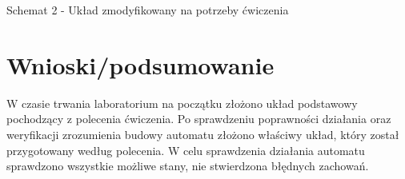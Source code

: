 \documentclass[12pt,a4paper]{article}
\begin{document}
		\vspace{0.5cm}
		\begin{center}
			Schemat 2 - Układ zmodyfikowany na potrzeby ćwiczenia
		\end{center}

	\section{Wnioski/podsumowanie}
	
		W czasie trwania laboratorium na początku złożono układ podstawowy pochodzący z polecenia ćwiczenia.
		Po sprawdzeniu poprawności działania oraz weryfikacji zrozumienia budowy automatu złożono właściwy
		układ, który został przygotowany według polecenia. W celu sprawdzenia działania automatu sprawdzono wszystkie możliwe stany,
		nie stwierdzona błędnych zachowań.
	
\end{document}
